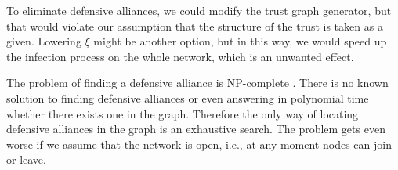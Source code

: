 To eliminate defensive alliances, we could modify the trust graph generator, but that would violate our assumption that the structure of the trust is taken as a given. Lowering $\xi$ might be another option, but in this way, we would speed up the infection process on the whole network, which is an unwanted effect.

The problem of finding a defensive alliance is NP-complete \cite{ouazine2018alliances}. There is no known solution to finding defensive alliances or even answering in polynomial time whether there exists one in the graph. Therefore the only way of locating defensive alliances in the graph is an exhaustive search. The problem gets even worse if we assume that the network is open, i.e., at any moment nodes can join or leave. 